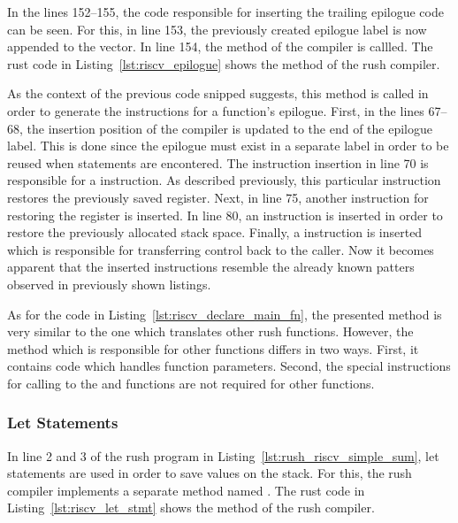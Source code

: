 In the lines 152--155, the code responsible for inserting the trailing epilogue code can be seen.
For this, in line 153, the previously created epilogue label is now appended to the  vector.
In line 154, the  method of the compiler is callled.
The rust code in Listing~\ref{lst:riscv_epilogue} shows the  method of the rush \riscv{} compiler.


As the context of the previous code snipped suggests, this method is called in order to generate the instructions for a function's epilogue.
First, in the lines 67--68, the insertion position of the compiler is updated to the end of the epilogue label.
This is done since the epilogue must exist in a separate label in order to be reused when  statements are encontered.
The instruction insertion in line 70 is responsible for a  instruction.
As described previously, this particular instruction restores the previously saved  register.
Next, in line 75, another  instruction for restoring the  register is inserted.
In line 80, an  instruction is inserted in order to restore the previously allocated stack space.
Finally, a  instruction is inserted which is responsible for transferring control back to the caller.
Now it becomes apparent that the inserted instructions resemble the already known patters observed in previously shown listings.

As for the code in Listing~\ref{lst:riscv_declare_main_fn},
the presented method is very similar to the one which translates other rush functions.
However, the  method which is responsible for other functions differs in two ways.
First, it contains code which handles function parameters.
Second, the special instructions for calling to the  and  functions are not required for other functions.

\subsubsection{Let Statements}

In line 2 and 3 of the rush program in Listing~\ref{lst:rush_riscv_simple_sum}, let statements are used in order to save values on the stack.
For this, the rush \riscv{} compiler implements a separate method named .
The rust code in Listing~\ref{lst:riscv_let_stmt} shows the  method of the rush \riscv{} compiler.


